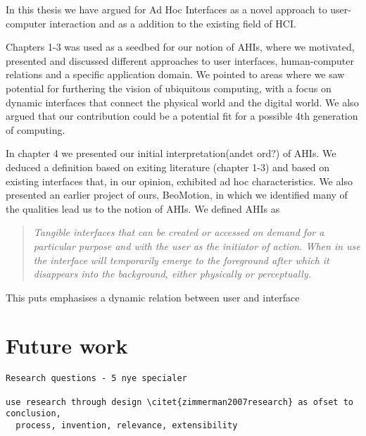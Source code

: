 In this thesis we have argued for Ad Hoc Interfaces as a novel approach to user-computer interaction and as a addition to the existing field of HCI. 

Chapters 1-3 was used as a seedbed for our notion of AHIs, where we motivated, presented and discussed different approaches to user interfaces, human-computer relations and a specific application domain.
We pointed to areas where we saw potential for furthering the vision of ubiquitous computing, with a focus on dynamic interfaces that connect the physical world and the digital world.
We also argued that our contribution could be a potential fit for a possible 4th generation of computing.  

In chapter 4 we presented our initial interpretation(andet ord?) of AHIs.
We deduced a definition based on exiting literature (chapter 1-3) and based on existing interfaces that, in our opinion, exhibited ad hoc characteristics.
We also presented an earlier project of ours, BeoMotion, in which we identified many of the qualities lead us to the notion of AHIs.
We defined AHIs as 

\begin{quotation}
\emph{Tangible interfaces that can be created or accessed on demand for a particular purpose and with the user as the initiator of action. When in use the interface will temporarily emerge to the foreground after which it disappears into the background, either physically or perceptually.}
\end{quotation}

This puts emphasises a dynamic relation between user and interface


\section{Future work}


\begin{verbatim}
Research questions - 5 nye specialer

use research through design \citet{zimmerman2007research} as ofset to conclusion,
  process, invention, relevance, extensibility 

\end{verbatim}


